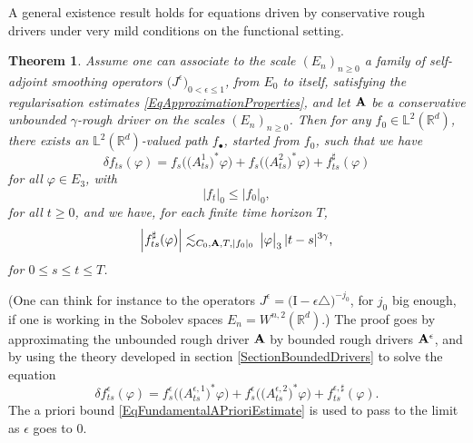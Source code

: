 \documentclass[11pt,a4paper]{amsart}
\newcommand{\RR}{\mathbb{R}}  \newcommand{\CC}{\mathbb{C}}  \newcommand{\LL}{\mathbb{L}}  \newcommand{\WW}{\mathbb{W}}
\newcommand{\ep}{\epsilon}
\renewcommand{\leq}{\leqslant}
\renewcommand{\geq}{\geqslant}
\newcommand{\ssk}{\smallskip}
\newtheorem{thm}{\hspace{-0.15cm}  {\sc Theorem} } %
\numberwithin{equation}{section} %
\begin{document}
\ssk

A general existence result holds for equations driven by conservative rough drivers under very mild conditions on the functional setting.

\begin{thm}
\label{ThmRDEHilbertGeneral}
Assume one can associate to the scale $(E_n)_{n\geq 0}$ a family of \emph{self-adjoint} smoothing operators $\big(J^\epsilon\big)_{0<\epsilon\leq 1}$, from $E_0$ to itself, satisfying the regularisation estimates \eqref{EqApproximationProperties}, and let $\bf A$ be a conservative unbounded $\gamma$-rough driver on the scales $(E_n)_{n\geq 0}$. Then for any $f_0\in\LL^2(\RR^d)$, there exists an $\LL^2(\RR^d)$-valued path $f_\bullet$, started from $f_0$, such that we have
\begin{equation*}
\delta f_{ts}(\varphi) = f_s\Big(\big(A^1_{ts}\big)^*\varphi\Big) + f_s\Big(\big(A^2_{ts}\big)^*\varphi\Big) + f^\sharp_{ts}(\varphi)
\end{equation*}
for all $\varphi\in E_3$, with 
\begin{equation*}
\big| f_t\big|_0\leq \big| f_0\big|_0,
\end{equation*}
for all $ t\geq 0$, and we have, for each finite time horizon $T$,
\begin{equation}
\label{EqBoundRemainderX}
\Big| f^\sharp_{ts}(\varphi) \Big| \lesssim_{C_0,{\bf A}, T,| f_0|_0}\,\big|\varphi\big|_3\,|t-s|^{3\gamma},
\end{equation}
for $0\leq s\leq t\leq T$.
\end{thm}

\noindent (One can think for instance to the operators $J^\ep = \big(\textrm{I}-\epsilon\triangle\big)^{-j_0}$, for $j_0$ big enough, if one is working in the Sobolev spaces $E_n = W^{n,2}(\RR^d)$.) The proof goes by approximating the unbounded rough driver $\bf A$ by bounded rough drivers  ${\bf A}^\epsilon$, and by using the theory developed in section \ref{SectionBoundedDrivers} to solve the equation
\begin{equation}
\label{EqApproximatedRDE}
\delta f^\epsilon_{ts}(\varphi) = f^\epsilon_s\Big(\big(A^{\epsilon,1}_{ts}\big)^*\varphi\Big) + f^\epsilon_s\Big(\big(A^{\epsilon,2}_{ts}\big)^*\varphi\Big) + f^{\epsilon,\sharp}_{ts}(\varphi).
\end{equation}
The a priori bound \eqref{EqFundamentalAPrioriEstimate} is used to pass to the limit as  $\epsilon$ goes to $0$.

\medskip
\end{document}
